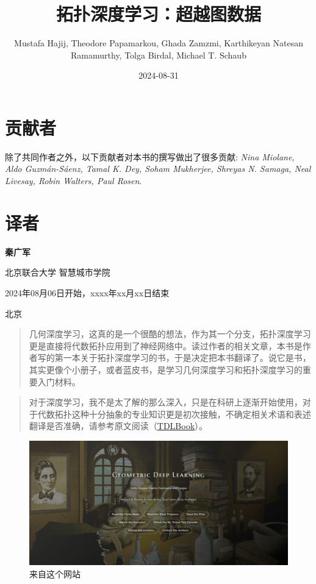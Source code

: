 \documentclass[
  12pt,
]{krantz}
\title{拓扑深度学习：超越图数据}
\author{Mustafa Hajij, Theodore Papamarkou, Ghada Zamzmi, Karthikeyan
Natesan Ramamurthy, Tolga Birdal, Michael T. Schaub}
\date{2024-08-31}
\begin{document}
\maketitle

{
\hypersetup{linkcolor=}
\setcounter{tocdepth}{2}
\tableofcontents
}
\listoffigures
\listoftables
\section*{贡献者}\label{ux8d21ux732eux8005}

除了共同作者之外，以下贡献者对本书的撰写做出了很多贡献: \emph{Nina
Miolane, Aldo Guzmán-Sáenz, Tamal K. Dey, Soham Mukherjee, Shreyas N.
Samaga, Neal Livesay, Robin Walters, Paul Rosen}.

\section*{译者}\label{ux8bd1ux8005}

\textbf{秦广军}

北京联合大学 智慧城市学院

2024年08月06日开始，xxxx年xx月xx日结束

北京

\begin{quote}
几何深度学习，这真的是一个很酷的想法，作为其一个分支，拓扑深度学习更是直接将代数拓扑应用到了神经网络中。读过作者的相关文章，本书是作者写的第一本关于拓扑深度学习的书，于是决定把本书翻译了。说它是书，其实更像个小册子，或者蓝皮书，是学习几何深度学习和拓扑深度学习的重要入门材料。
\end{quote}

\begin{quote}
对于深度学习，我不是太了解的那么深入，只是在科研上逐渐开始使用，对于代数拓扑这种十分抽象的专业知识更是初次接触，不确定相关术语和表述翻译是否准确，请参考原文阅读（\href{https://tdlbook.org/}{TDLBook}）。
\end{quote}

\begin{figure}

{\centering \includegraphics{figures/face} 

}

\caption{来自这个网站}\label{fig:thissite}
\end{figure}
\end{document}
